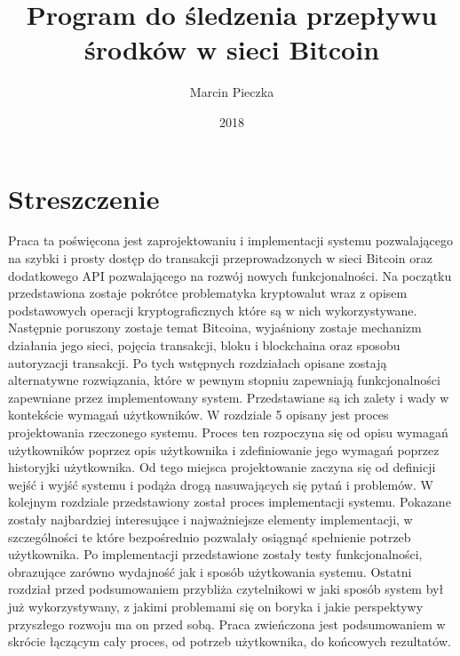 \documentclass[12pt, en, eng, oneside, final]{mgr}
\begin{document}
\title{Program do śledzenia przepływu środków w sieci Bitcoin}
\date{2018}
\author{Marcin Pieczka}
\maketitle

\tableofcontents

\pagebreak 

\section*{Streszczenie}
Praca ta poświęcona jest zaprojektowaniu i implementacji systemu pozwalającego na szybki i prosty dostęp do transakcji przeprowadzonych w sieci Bitcoin oraz dodatkowego API pozwalającego na rozwój nowych funkcjonalności. Na początku przedstawiona zostaje pokrótce problematyka kryptowalut wraz z opisem podstawowych operacji kryptograficznych które są w nich wykorzystywane. Następnie poruszony zostaje temat Bitcoina, wyjaśniony zostaje mechanizm działania jego sieci, pojęcia transakcji, bloku i blockchaina oraz sposobu autoryzacji transakcji. Po tych wstępnych rozdziałach opisane zostają alternatywne rozwiązania, które w pewnym stopniu zapewniają funkcjonalności zapewniane przez implementowany system. Przedstawiane są ich zalety i wady w kontekście wymagań użytkowników. W rozdziale 5 opisany jest proces projektowania rzeczonego systemu. Proces ten rozpoczyna się od opisu wymagań użytkowników poprzez opis użytkownika i zdefiniowanie jego wymagań poprzez historyjki użytkownika. Od tego miejsca projektowanie zaczyna się od definicji wejść i wyjść systemu i podąża drogą nasuwających się pytań i problemów. W kolejnym rozdziale przedstawiony został proces implementacji systemu. Pokazane zostały najbardziej interesujące i najważniejsze elementy implementacji, w szczególności te które bezpośrednio pozwalały osiągnąć spełnienie potrzeb użytkownika. Po implementacji przedstawione zostały testy funkcjonalności, obrazujące zarówno wydajność jak i sposób użytkowania systemu. Ostatni rozdział przed podsumowaniem przybliża czytelnikowi w jaki sposób system był już wykorzystywany, z jakimi problemami się on boryka i jakie perspektywy przyszłego rozwoju ma on przed sobą. Praca zwieńczona jest podsumowaniem w skrócie łączącym cały proces, od potrzeb użytkownika, do końcowych rezultatów. 
\end{document}
